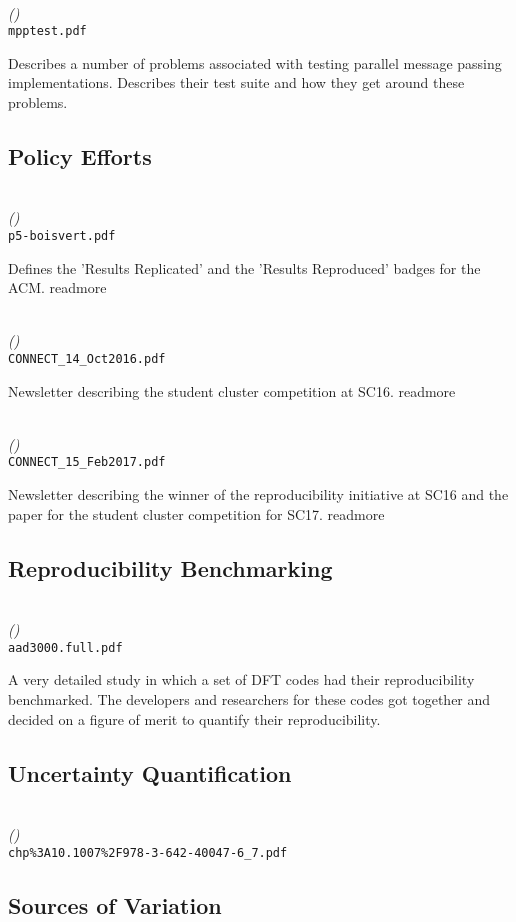\documentclass{article}
\newcommand{\readmore}{
	\gls{readmore}
}
\newenvironment{refdef}[2] {
	\noindent \textbf{\citetitle{#1}} \cite{#1}\\ \citejournalorbooktitle{#1} \textit{(\citeyear{#1})}\\ \texttt{#2} \vspace{0.2in} \par 
} {
\vspace{0.2in}
}
\begin{document}
\begin{refdef}{gropp-mpi-repro-perf}{mpptest.pdf}
Describes a number of problems associated with testing parallel message passing implementations. Describes their test suite and how they get around these problems.
\end{refdef}

\subsection{Policy Efforts}

\begin{refdef}{acm-badging-announcement}{p5-boisvert.pdf}
Defines the 'Results Replicated' and the 'Results Reproduced' badges for the ACM. \readmore
\end{refdef}

\begin{refdef}{sighpc-connect-repro-1}{CONNECT\_14\_Oct2016.pdf}
Newsletter describing the student cluster competition at SC16. \readmore
\end{refdef}

\begin{refdef}{sighpc-connect-repro-2}{CONNECT\_15\_Feb2017.pdf}
Newsletter describing the winner of the reproducibility initiative at SC16 and the paper for the student cluster competition for SC17. \readmore
\end{refdef}

\subsection{Reproducibility Benchmarking}

\begin{refdef}{reproducibility-benchmark-dft}{aad3000.full.pdf}
A very detailed study in which a set of DFT codes had their reproducibility benchmarked. The developers and researchers for these codes got together and decided on a figure of merit to quantify their reproducibility.
\end{refdef}


\subsection{Uncertainty Quantification}

\begin{refdef}{Wilke2013}{chp\%3A10.1007\%2F978-3-642-40047-6\_7.pdf}
\end{refdef}

\subsection{Sources of Variation}
\end{document}
